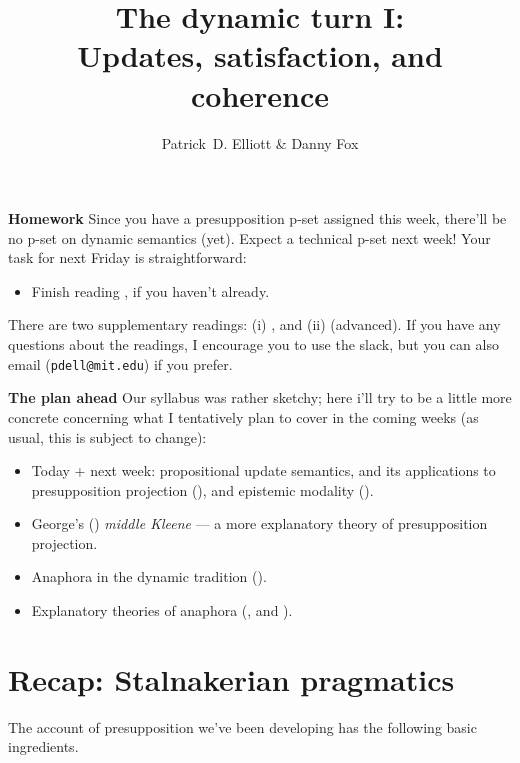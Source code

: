 \documentclass[nols,twoside,nofonts,nobib,nohyper]{tufte-handout}
\title{The dynamic turn I:\\
Updates, satisfaction, and coherence}
\author[Patrick D. Elliott \& Danny Fox]{Patrick~D. Elliott \& Danny Fox}
\theoremstyle{definition}
\begin{document}
\maketitle%

\begin{tcolorbox}
\textbf{Homework}
\tcblower
Since you have a presupposition p-set assigned this week, there'll be no p-set on dynamic semantics (yet). Expect a technical p-set next week! Your task for next Friday is straightforward:
\begin{itemize}
    \item Finish reading \citet{Yalcin2013}, if you haven't already.
\end{itemize}
There are two supplementary readings: (i) \cite{Heim1983}, and (ii) \cite{Veltman1996} (advanced). If you have any questions about the readings, I encourage you to use the slack, but you can also email (\texttt{pdell@mit.edu}) if you prefer.
\end{tcolorbox}

\begin{tcolorbox}
  \textbf{The plan ahead}
  \tcblower
  Our syllabus was rather sketchy; here i'll try to be a little more concrete concerning what I tentatively plan to cover in the coming weeks (as usual, this is subject to change):
  \begin{itemize}
      \item Today + next week: propositional update semantics, and its applications to presupposition projection (\citealt{Heim1983}), and epistemic modality (\citealt{Veltman1996,GroenendijkEtAl1996}).
      \item George's (\citeyear{George2007,George2008,George2014}) \textit{middle Kleene} --- a more explanatory theory of presupposition projection.
      \item Anaphora in the dynamic tradition (\citealt{Heim1982,GroenendijkStokhof1991,Dekker1994}).
      \item Explanatory theories of anaphora (\citealt{Rothschild2017}, \citealt{Elliott2020b,Elliott2020d} and \citealt{Mandelkern2020a,Mandelkern2020b}).
  \end{itemize}
\end{tcolorbox}

\section{Recap: Stalnakerian pragmatics}

The account of presupposition we've been developing has the following basic ingredients.
\end{document}
